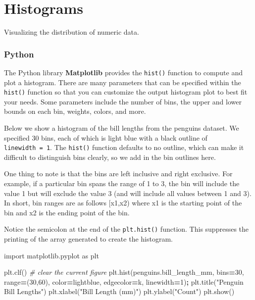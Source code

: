\documentclass[
]{book}
\newenvironment{Shaded}{\begin{snugshade}}{\end{snugshade}}
\newcommand{\BuiltInTok}[1]{#1}
\newcommand{\CommentTok}[1]{\textcolor[rgb]{0.56,0.35,0.01}{\textit{#1}}}
\newcommand{\DecValTok}[1]{\textcolor[rgb]{0.00,0.00,0.81}{#1}}
\newcommand{\ImportTok}[1]{#1}
\newcommand{\NormalTok}[1]{#1}
\newcommand{\OperatorTok}[1]{\textcolor[rgb]{0.81,0.36,0.00}{\textbf{#1}}}
\newcommand{\StringTok}[1]{\textcolor[rgb]{0.31,0.60,0.02}{#1}}
\begin{document}
\hypertarget{histograms}{%
\section{Histograms}\label{histograms}}

Visualizing the distribution of numeric data.

\hypertarget{python-41}{%
\subsubsection*{Python}\label{python-41}}

The Python library \textbf{Matplotlib} provides the \texttt{hist()} function to compute and plot a histogram. There are many parameters that can be specified within the \texttt{hist()} function so that you can customize the output histogram plot to best fit your needs. Some parameters include the number of bins, the upper and lower bounds on each bin, weights, colors, and more.

Below we show a histogram of the bill lengths from the penguins dataset. We specified 30 bins, each of which is light blue with a black outline of \texttt{linewidth\ =\ 1}. The \texttt{hist()} function defaults to no outline, which can make it difficult to distinguish bins clearly, so we add in the bin outlines here.

One thing to note is that the bins are left inclusive and right exclusive. For example, if a particular bin spans the range of 1 to 3, the bin will include the value 1 but will exclude the value 3 (and will include all values between 1 and 3). In short, bin ranges are as follows {[}x1,x2) where x1 is the starting point of the bin and x2 is the ending point of the bin.

Notice the semicolon at the end of the \texttt{plt.hist()} function. This suppresses the printing of the array generated to create the histogram.

\begin{Shaded}
\begin{Highlighting}[]
\ImportTok{import}\NormalTok{ matplotlib.pyplot }\ImportTok{as}\NormalTok{ plt}

\NormalTok{plt.clf() }\CommentTok{\# clear the current figure}
\NormalTok{plt.hist(penguins.bill\_length\_mm, bins}\OperatorTok{=}\DecValTok{30}\NormalTok{, }\BuiltInTok{range}\OperatorTok{=}\NormalTok{(}\DecValTok{30}\NormalTok{,}\DecValTok{60}\NormalTok{),}
\NormalTok{         color}\OperatorTok{=}\StringTok{\textquotesingle{}lightblue\textquotesingle{}}\NormalTok{, edgecolor}\OperatorTok{=}\StringTok{\textquotesingle{}k\textquotesingle{}}\NormalTok{, linewidth}\OperatorTok{=}\DecValTok{1}\NormalTok{)}\OperatorTok{;}
\NormalTok{plt.title(}\StringTok{"Penguin Bill Lengths"}\NormalTok{)}
\NormalTok{plt.xlabel(}\StringTok{"Bill Length (mm)"}\NormalTok{)}
\NormalTok{plt.ylabel(}\StringTok{"Count"}\NormalTok{)}
\NormalTok{plt.show()}
\end{Highlighting}
\end{Shaded}
\end{document}
